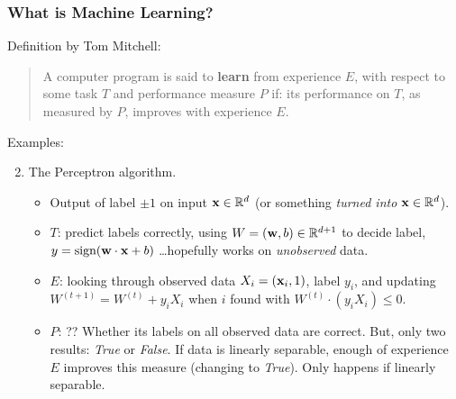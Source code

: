 \documentclass{beamer}
\theoremstyle{example}
\begin{document}
\begin{frame}
\frametitle{What is Machine Learning?}
    Definition by Tom Mitchell:\newline 
    \begin{quote}
        A computer program is said to \textbf{learn} from experience $E$, with respect to some task $T$ and performance measure $P$ if: its performance on $T$, as measured by $P$, improves with experience $E$.
    \end{quote}
    
    {\color{mygreen}Examples:}
    \begin{enumerate}
        \setcounter{enumi}{1}
        \item The Perceptron algorithm.
        \begin{itemize}
            \item Output of label $\pm 1$ on input ${\bf x}\in \mathbb R^d$ (or something \textit{turned into} ${\bf x}\in\mathbb R^d$).
            \pause
            \item $T$: predict labels correctly, using $W = ({\bf w}, b)\in\mathbb R^{d+1}$ to decide label, $y = \textrm{sign}({\bf w}\cdot{\bf x} + b)$ \newline 
            \ldots hopefully works on \textit{unobserved} data.
            \pause
            \item $E$: looking through observed data $X_i = ({\bf x}_i,1)$, label $y_i$, and updating $W^{(t+1)} = W^{(t)} + y_iX_i$ when $i$ found with $W^{(t)}\cdot(y_iX_i)\le 0$.
            \pause
            \item $P$: ?? \newline 
                    Whether its labels on all observed data are correct. But, only two results: \textit{True} or \textit{False}. \newline 
                    \pause
                    If data is linearly separable, enough of experience $E$ improves this measure (changing to \textit{True}). Only happens if linearly separable.
        \end{itemize}
    \end{enumerate}

\end{frame}
\end{document}
